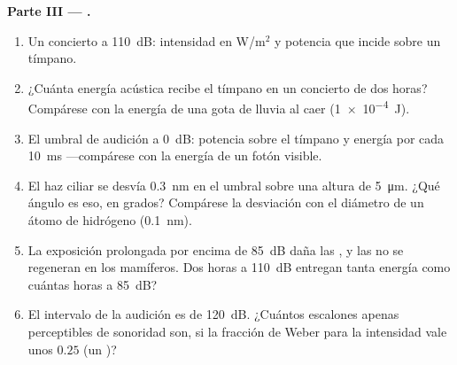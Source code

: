 \begin{problem}
\medskip
\noindent\textbf{Parte III --- .}
\begin{enumerate}[resume]
  \item Un concierto a \qty{110}{dB}: intensidad en W/m$^{2}$ y
        potencia que incide sobre un tímpano.
  \item ¿Cuánta energía acústica recibe el tímpano en un concierto de
        dos horas? Compárese con la energía de una gota de lluvia al
        caer (\qty{1e-4}{J}).
  \item El umbral de audición a \qty{0}{dB}: potencia sobre el tímpano
        y energía por cada \qty{10}{ms} ---compárese con la energía de
        un fotón visible.
  \item El haz ciliar se desvía \qty{0.3}{nm} en el umbral sobre una
        altura de \qty{5}{\micro m}. ¿Qué ángulo es eso, en grados?
        Compárese la desviación con el diámetro de un átomo de
        hidrógeno (\qty{0.1}{nm}).
  \item La exposición prolongada por encima de \qty{85}{dB} daña las
        , y las  no se regeneran en los
        mamíferos. Dos horas a \qty{110}{dB} entregan tanta energía
        como cuántas horas a \qty{85}{dB}?
  \item El intervalo de la audición es de \qty{120}{dB}. ¿Cuántos
        escalones apenas perceptibles de sonoridad son, si la fracción
        de Weber para la intensidad vale unos $0.25$ (un )?
\end{enumerate}


\end{problem}
